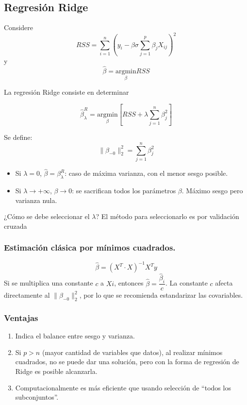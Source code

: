 \documentclass[
  12pt,
]{book}
\providecommand{\tightlist}{%
  \setlength{\itemsep}{0pt}\setlength{\parskip}{0pt}}
\theoremstyle{definition}
\theoremstyle{definition}
\theoremstyle{definition}
\theoremstyle{remark}
\begin{document}
\hypertarget{regresiuxf3n-ridge}{%
\subsection{Regresión Ridge}\label{regresiuxf3n-ridge}}

Considere
\[ RSS = \sum_{i=1}^{n}\left(y_i-\beta\sigma\sum_{j=1}^{p}\beta_jX_{ij}\right)^2 \]
y
\[
\hat\beta = \underset{\beta}{\mathrm{argmin}} RSS
\]

La regresión Ridge consiste en determinar

\[ \hat\beta^R_\lambda = \underset{\beta}{\mathrm{argmin}}\left[RSS + \lambda\sum_{j=1}^n\beta_j^2\right]\]

Se define:
\[\|\beta_{-0}\|^2_2 = \sum_{j=1}^{n}\beta_j^2\]

\begin{itemize}
\tightlist
\item
  Si \(\lambda = 0\), \(\hat\beta = \beta^R_\lambda\): caso de máxima varianza, con el menor sesgo posible.
\item
  Si \(\lambda \to +\infty\), \(\beta \to 0\): se sacrifican todos los parámetros \(\beta\). Máximo sesgo pero varianza nula.
\end{itemize}

¿Cómo se debe seleccionar el \(\lambda\)?
El método para seleccionarlo es por validación cruzada

\hypertarget{estimaciuxf3n-cluxe1sica-por-muxednimos-cuadrados.}{%
\subsubsection{Estimación clásica por mínimos cuadrados.}\label{estimaciuxf3n-cluxe1sica-por-muxednimos-cuadrados.}}

\[ \hat\beta = (X^T\cdot X)^{-1}X^Ty\]
Si se multiplica una constante \(c\) a \(Xi\), entonces \(\hat\beta = \dfrac{\hat\beta_i}{c}\). La constante \(c\) afecta directamente al \(\|\beta_{-0}\|^2_2\), por lo que se recomienda estandarizar las covariables.

\hypertarget{ventajas}{%
\subsubsection{Ventajas}\label{ventajas}}

\begin{enumerate}
\def\labelenumi{\arabic{enumi}.}
\tightlist
\item
  Indica el balance entre sesgo y varianza.
\item
  Si \(p>n\) (mayor cantidad de variables que datos), al realizar mínimos cuadrados, no se puede dar una solución, pero con la forma de regresión de Ridge es posible alcanzarla.
\item
  Computacionalmente es más eficiente que usando selección de ``todos los subconjuntos''.
\end{enumerate}
\end{document}
